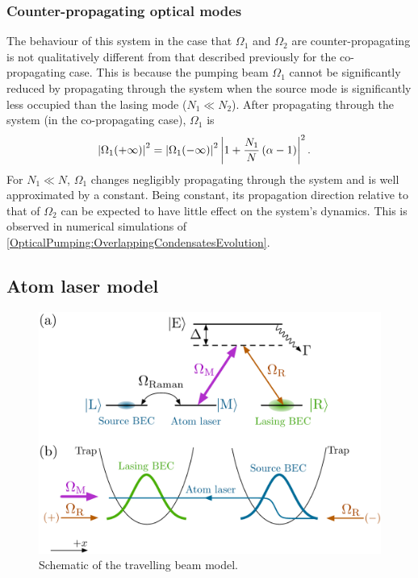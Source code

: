 \subsubsection{Counter-propagating optical modes}
The behaviour of this system in the case that $\Omega_1$ and $\Omega_2$ are counter-propagating is not qualitatively different from that described previously for the co-propagating case.  This is because the pumping beam $\Omega_1$ cannot be significantly reduced by propagating through the system when the source mode is significantly less occupied than the lasing mode ($N_1 \ll N_2$).  After propagating through the system (in the co-propagating case), $\Omega_1$ is
\begin{align}
    \left|\Omega_1(+\infty)\right|^2 &= \left|\Omega_1(-\infty)\right|^2 \left|1 + \frac{N_1}{N}\left(\alpha - 1\right)\right|^2.
\end{align}
For $N_1 \ll N$, $\Omega_1$ changes negligibly propagating through the system and is well approximated by a constant.  Being constant, its propagation direction relative to that of $\Omega_2$ can be expected to have little effect on the system's dynamics.  This is observed in numerical simulations of \eqref{OpticalPumping:OverlappingCondensatesEvolution}.


\subsection{Atom laser model}
\label{OpticalPumping:SimpleModels:AtomLaserModel}

\begin{figure}
    \centering
    \includegraphics[width=12cm]{TravellingBeamModel}
    \caption{Schematic of the travelling beam model.}
    \label{OpticalPumping:TravellingBeamModel}
\end{figure}

